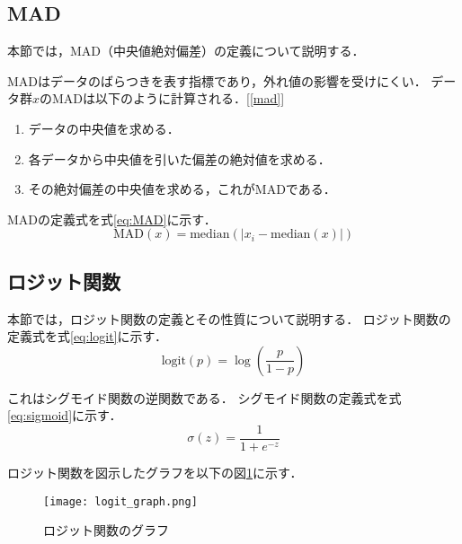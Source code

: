 \documentclass[dvipdfmx]{jreport}
\begin{document}

\subsection{MAD}
本節では，MAD（中央値絶対偏差）の定義について説明する．

MADはデータのばらつきを表す指標であり，外れ値の影響を受けにくい．
データ群$x$のMADは以下のように計算される．[\ref{mad}]
\begin{tcolorbox}[title=\textbf{MADの求め方}]
    \begin{enumerate}
        \item データの中央値を求める．
        \item 各データから中央値を引いた偏差の絶対値を求める．
        \item その絶対偏差の中央値を求める，これがMADである．
    \end{enumerate}
\end{tcolorbox}
MADの定義式を式\eqref{eq:MAD}に示す．
\begin{equation}
\mathrm{MAD}(x) = \mathrm{median} \left( \left| x_i - \mathrm{median}(x) \right| \right) \label{eq:MAD}
\end{equation}

\subsection{ロジット関数}
本節では，ロジット関数の定義とその性質について説明する．
ロジット関数の定義式を式\eqref{eq:logit}に示す．
\begin{equation}
    \text{logit}(p) = \log\left( \frac{p}{1 - p} \right) \label{eq:logit}
\end{equation}

これはシグモイド関数の逆関数である．
シグモイド関数の定義式を式\eqref{eq:sigmoid}に示す．
\begin{equation}
    \sigma(z) = \frac{1}{1 + e^{-z}} \label{eq:sigmoid}
\end{equation}

ロジット関数を図示したグラフを以下の図\ref{fig:logit}に示す．
\begin{figure}[h]
    \begin{center}
        \texttt{[image: logit\_graph.png]} 
        \caption{ロジット関数のグラフ} \label{fig:logit}
    \end{center}
\end{figure}
\end{document}
